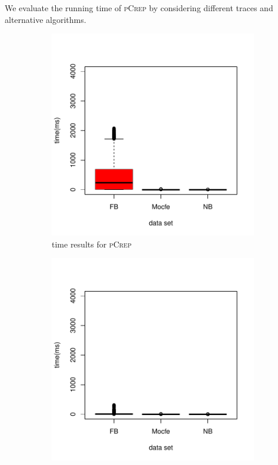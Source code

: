 \documentclass[a4paper,UKenglish,cleveref, autoref, thm-restate,authorcolumns]{../lipics/lipics-v2019}
\newcommand{\adjDel}{\textsc{pCrep}}
\begin{document}
We evaluate the running time of \adjDel{} by considering different traces 
and alternative algorithms. 
	\begin{figure}[ht]
		\centering
		\begin{minipage}{0.48\linewidth}
			\begin{subfigure}[b]{\linewidth}
				\includegraphics*[width=\linewidth]{new_time_all_filtered_decompTree}
				\caption{time results for \adjDel}
			\end{subfigure}		
		\end{minipage}
		\begin{minipage}{0.48\linewidth}
			\begin{subfigure}[b]{\linewidth}
				\includegraphics*[width=\linewidth]{new_time_all_filtered_compDecomp}

\end{subfigure}
\end{minipage}
\end{figure}
\end{document}
